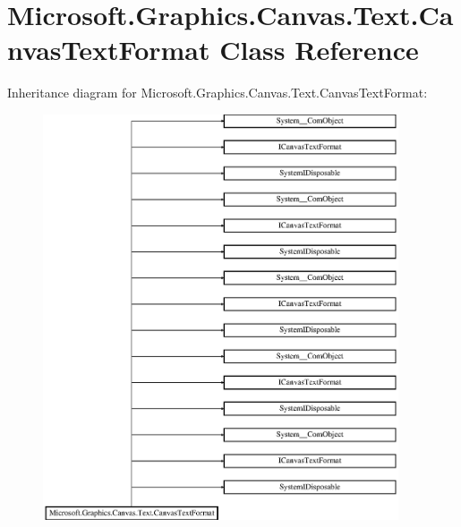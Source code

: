 \hypertarget{class_microsoft_1_1_graphics_1_1_canvas_1_1_text_1_1_canvas_text_format}{}\section{Microsoft.\+Graphics.\+Canvas.\+Text.\+Canvas\+Text\+Format Class Reference}
\label{class_microsoft_1_1_graphics_1_1_canvas_1_1_text_1_1_canvas_text_format}
Inheritance diagram for Microsoft.\+Graphics.\+Canvas.\+Text.\+Canvas\+Text\+Format\+:\begin{figure}[H]
\begin{center}
\leavevmode
\includegraphics[height=12.000000cm]{class_microsoft_1_1_graphics_1_1_canvas_1_1_text_1_1_canvas_text_format}
\end{center}
\end{figure}
